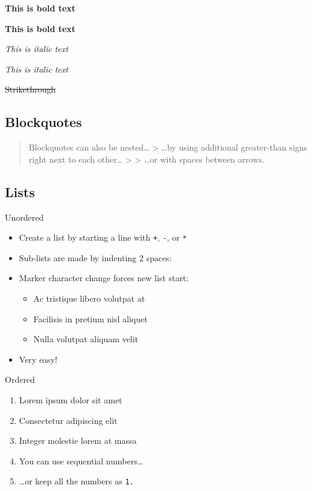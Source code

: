\documentclass[]{article}
\providecommand{\tightlist}{%
  \setlength{\itemsep}{0pt}\setlength{\parskip}{0pt}}
\begin{document}
\textbf{This is bold text}

\textbf{This is bold text}

\emph{This is italic text}

\emph{This is italic text}

\sout{Strikethrough}

\subsection{Blockquotes}\label{blockquotes}

\begin{quote}
Blockquotes can also be nested\ldots{} \textgreater{} \ldots{}by using
additional greater-than signs right next to each other\ldots{}
\textgreater{} \textgreater{} \ldots{}or with spaces between arrows.
\end{quote}

\subsection{Lists}\label{lists}

Unordered

\begin{itemize}
\tightlist
\item
  Create a list by starting a line with \texttt{+}, \texttt{-}, or
  \texttt{*}
\item
  Sub-lists are made by indenting 2 spaces:
\item
  Marker character change forces new list start:

  \begin{itemize}
  \tightlist
  \item
    Ac tristique libero volutpat at
  \item
    Facilisis in pretium nisl aliquet
  \item
    Nulla volutpat aliquam velit
  \end{itemize}
\item
  Very easy!
\end{itemize}

Ordered

\begin{enumerate}
\def\labelenumi{\arabic{enumi}.}
\item
  Lorem ipsum dolor sit amet
\item
  Consectetur adipiscing elit
\item
  Integer molestie lorem at massa
\item
  You can use sequential numbers\ldots{}
\item
  \ldots{}or keep all the numbers as \texttt{1.}
\end{enumerate}
\end{document}
